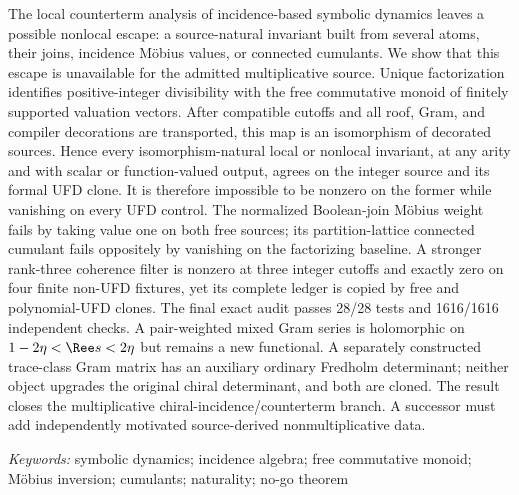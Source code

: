 The local counterterm analysis of incidence-based symbolic dynamics leaves a
possible nonlocal escape: a source-natural invariant built from several
atoms, their joins, incidence M{\"o}bius values, or connected cumulants.  We
show that this escape is unavailable for the admitted multiplicative source.
Unique factorization identifies positive-integer divisibility with the free
commutative monoid of finitely supported valuation vectors.  After compatible
cutoffs and all roof, Gram, and compiler decorations are transported, this
map is an isomorphism of decorated sources.  Hence every
isomorphism-natural local or nonlocal invariant, at any arity and with scalar
or function-valued output, agrees on the integer source and its formal UFD
clone.  It is therefore impossible to be nonzero on the former while
vanishing on every UFD control.  The normalized Boolean-join M{\"o}bius
weight fails by taking value one on both free sources; its partition-lattice
connected cumulant fails oppositely by vanishing on the factorizing baseline.
A stronger rank-three coherence filter is nonzero at three integer cutoffs
and exactly zero on four finite non-UFD fixtures, yet its complete ledger is
copied by free and polynomial-UFD clones.  The final exact audit passes 28/28
tests and 1616/1616 independent checks.  A pair-weighted mixed Gram series is
holomorphic on $1-2\eta<\Ree s<2\eta$ but remains a new functional.  A
separately constructed trace-class Gram matrix has an auxiliary ordinary
Fredholm determinant; neither object upgrades the original chiral
determinant, and both are cloned.  The result closes the multiplicative
chiral-incidence/counterterm branch.  A successor must add independently
motivated source-derived nonmultiplicative data.

\medskip\noindent
\textit{Keywords:} symbolic dynamics; incidence algebra; free commutative
monoid; M{\"o}bius inversion; cumulants; naturality; no-go theorem
